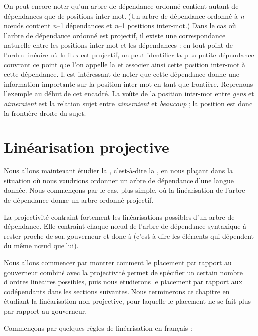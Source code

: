 {    On peut encore noter qu'un arbre de dépendance ordonné contient autant de dépendances que de positions inter-mot. (Un arbre de dépendance ordonné à \textit{n} nœuds contient \textit{n}–1 dépendances et \textit{n}–1 positions inter-mot.) Dans le cas où l'arbre de dépendance ordonné est projectif, il existe une correspondance naturelle entre les positions inter-mot et les dépendances : en tout point de l’ordre linéaire où le flux est projectif, on peut identifier la plus petite dépendance couvrant ce point que l’on appelle la  et associer ainsi cette position inter-mot à cette dépendance. Il est intéressant de noter que cette dépendance donne une information importante sur la position inter-mot en tant que frontière. Reprenons l’exemple au début de cet encadré. La voûte de la position inter-mot entre \textit{gens} et \textit{aimeraient} est la relation sujet entre \textit{aimeraient} et \textit{beaucoup} ; la position est donc la frontière droite du sujet.
}
\section{Linéarisation projective}\label{sec:3.5.18}

Nous allons maintenant étudier la , c’est-à-dire la , en nous plaçant dans la situation où nous voudrions ordonner un arbre de dépendance d’une langue donnée. Nous commençons par le cas, plus simple, où la linéarisation de l’arbre de dépendance donne un arbre ordonné projectif.

La projectivité contraint fortement les linéarisations possibles d’un arbre de dépendance. Elle contraint chaque nœud de l’arbre de dépendance syntaxique à rester proche de son gouverneur et donc à  (c’est-à-dire les éléments qui dépendent du même nœud que lui).

Nous allons commencer par montrer comment le placement par rapport au gouverneur combiné avec la projectivité permet de spécifier un certain nombre d’ordres linéaires possibles, puis nous étudierons le placement par rapport aux codépendants dans les sections suivantes. Nous terminerons ce chapitre en étudiant la linéarisation non projective, pour laquelle le placement ne se fait plus par rapport au gouverneur.


Commençons par quelques règles de linéarisation en français :


